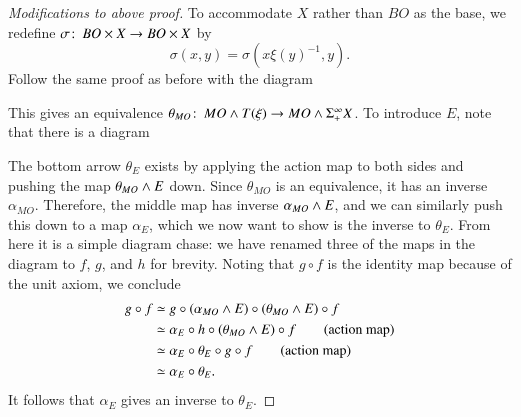 \begin{proof}[Modifications to above proof]
To accommodate $X$ rather than $BO$ as the base, we redefine $\sigma\colon\thinspace BO \times X \to BO \times X$ by \[\sigma(x, y) = \sigma(x \xi(y)^{-1}, y).\]  Follow the same proof as before with the diagram
\begin{center}
\end{center}
This gives an equivalence $\theta_{MO}\colon\thinspace MO \wedge T(\xi) \rightarrow MO \wedge \Sigma^\infty_+ X$.  To introduce $E$, note that there is a diagram
\begin{center}
\end{center}
The bottom arrow $\theta_E$ exists by applying the action map to both sides and pushing the map $\theta_{MO} \wedge E$ down.  Since $\theta_{MO}$ is an equivalence, it has an inverse $\alpha_{MO}$.  Therefore, the middle map has inverse $\alpha_{MO} \wedge E$, and we can similarly push this down to a map $\alpha_E$, which we now want to show is the inverse to $\theta_E$.  From here it is a simple diagram chase: we have renamed three of the maps in the diagram to $f$, $g$, and $h$ for brevity.  Noting that $g \circ f$ is the identity map because of the unit axiom, we conclude
\begin{align*}
g \circ f & \simeq g \circ (\alpha_{MO} \wedge E) \circ (\theta_{MO} \wedge E) \circ f \\
& \simeq \alpha_E \circ h \circ (\theta_{MO}\wedge E) \circ f \tag{action map} \\
& \simeq \alpha_E \circ \theta_E \circ g \circ f \tag{action map} \\
& \simeq \alpha_E \circ \theta_E.
\end{align*}
It follows that $\alpha_E$ gives an inverse to $\theta_E$.
\end{proof}

